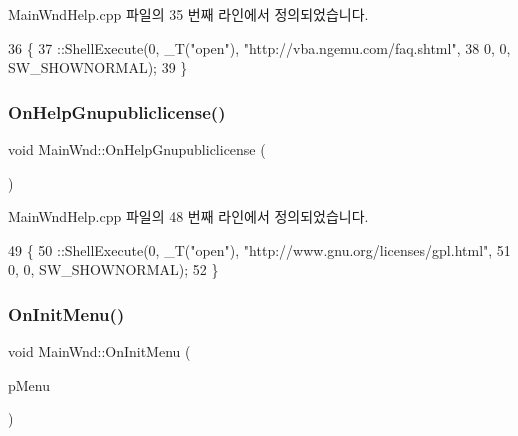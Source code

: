 Main\+Wnd\+Help.\+cpp 파일의 35 번째 라인에서 정의되었습니다.


\begin{DoxyCode}
36 \{
37   ::ShellExecute(0, \_T(\textcolor{stringliteral}{"open"}), \textcolor{stringliteral}{"http://vba.ngemu.com/faq.shtml"}, 
38                  0, 0, SW\_SHOWNORMAL);
39 \}
\end{DoxyCode}
\mbox{\label{class_main_wnd_ac0666597df52e2525a34d65f9795db75}} 
\subsubsection{\texorpdfstring{On\+Help\+Gnupubliclicense()}{OnHelpGnupubliclicense()}}
{\footnotesize\ttfamily void Main\+Wnd\+::\+On\+Help\+Gnupubliclicense (\begin{DoxyParamCaption}{ }\end{DoxyParamCaption})\hspace{0.3cm}{\ttfamily [protected]}}



Main\+Wnd\+Help.\+cpp 파일의 48 번째 라인에서 정의되었습니다.


\begin{DoxyCode}
49 \{
50   ::ShellExecute(0, \_T(\textcolor{stringliteral}{"open"}), \textcolor{stringliteral}{"http://www.gnu.org/licenses/gpl.html"}, 
51                  0, 0, SW\_SHOWNORMAL);  
52 \}
\end{DoxyCode}
\mbox{\label{class_main_wnd_a7bb12340c3ca647cc23d751319302225}} 
\subsubsection{\texorpdfstring{On\+Init\+Menu()}{OnInitMenu()}}
{\footnotesize\ttfamily void Main\+Wnd\+::\+On\+Init\+Menu (\begin{DoxyParamCaption}\item[{C\+Menu $\ast$}]{p\+Menu }\end{DoxyParamCaption})\hspace{0.3cm}{\ttfamily [protected]}}



